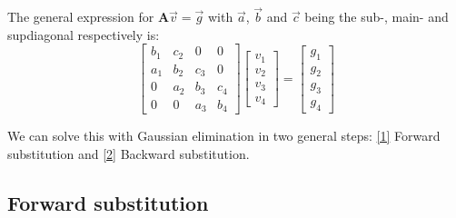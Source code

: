 \documentclass[english,notitlepage]{article}  %
\begin{document}
    The general expression for $\boldsymbol{A}\vec{v} = \vec{g}$ with $\vec{a}$, $\vec{b}$ and $\vec{c}$ being the sub-, main- and supdiagonal respectively is:
    \begin{equation}\label{eq:mat_Avg}
        \begin{bmatrix}
            b_1 & c_2 & 0 & 0 \\
            a_1 & b_2 & c_3 & 0 \\
            0 & a_2 & b_3 & c_4 \\
            0 & 0 & a_3 & b_4
        \end{bmatrix} \begin{bmatrix}
            v_1\\
            v_2\\
            v_3\\
            v_4
        \end{bmatrix} = \begin{bmatrix}
            g_1\\
            g_2\\
            g_3\\
            g_4
        \end{bmatrix}
    \end{equation}

    We can solve this with Gaussian elimination in two general steps: \hyperref[sec:forward]{[1]} Forward substitution and \hyperref[sec:backward]{[2]} Backward substitution.

    \subsection*{Forward substitution}\label{sec:forward}
\end{document}
